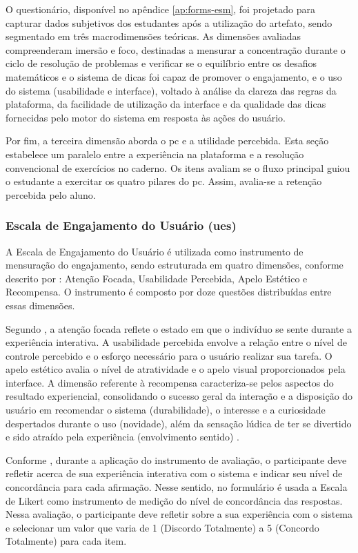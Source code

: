 O questionário, disponível no apêndice \ref{ap:forms-esm}, foi projetado para
capturar dados subjetivos dos estudantes após a utilização do artefato, sendo
segmentado em três macrodimensões teóricas. As dimensões avaliadas compreenderam
imersão e foco, destinadas a mensurar a concentração durante o ciclo de resolução
de problemas e verificar se o equilíbrio entre os desafios matemáticos e o
sistema de dicas foi capaz de promover o engajamento, e o uso do sistema
(usabilidade e interface), voltado à análise da clareza das regras da
plataforma, da facilidade de utilização da interface e da qualidade das dicas
fornecidas pelo motor do sistema em resposta às ações do usuário.

Por fim, a terceira dimensão aborda o \gls{pc} e a utilidade percebida. Esta seção
estabelece um paralelo entre a experiência na plataforma e a resolução
convencional de exercícios no caderno. Os itens avaliam se o fluxo principal
guiou o estudante a exercitar os quatro pilares do \gls{pc}. Assim, avalia-se a retenção
percebida pelo aluno.


\subsubsection{Escala de Engajamento do Usuário (\texorpdfstring{\acrshort{ues}}{UES})}
\label{sec:ues_form}
A Escala de Engajamento do Usuário é utilizada como instrumento de mensuração do engajamento, sendo estruturada em quatro dimensões, conforme descrito por : Atenção Focada, Usabilidade Percebida, Apelo Estético e Recompensa. O instrumento é composto por doze questões distribuídas entre essas dimensões.

Segundo , a atenção focada reflete o estado em que o
indivíduo se sente durante a experiência interativa. A usabilidade percebida envolve
a relação entre o nível de controle percebido e o esforço necessário para o
usuário realizar sua tarefa. O apelo estético avalia o nível de atratividade e
o apelo visual proporcionados pela interface. A dimensão referente à recompensa
caracteriza-se pelos aspectos do resultado experiencial, consolidando o sucesso
geral da interação e a disposição do usuário em recomendar o sistema
(durabilidade), o interesse e a curiosidade despertados durante o uso
(novidade), além da sensação lúdica de ter se divertido e sido atraído pela
experiência (envolvimento sentido) \cite{obrien2018practical}.

Conforme , durante a aplicação do instrumento de
avaliação, o participante deve refletir acerca de sua experiência interativa com
o sistema e indicar seu nível de concordância para cada afirmação. Nesse
sentido, no formulário é usada a Escala de Likert como instrumento de medição do
nível de concordância das respostas. Nessa avaliação, o participante deve
refletir sobre a sua experiência com o sistema e selecionar um valor que varia
de 1 (Discordo Totalmente) a 5 (Concordo Totalmente) para cada item.

